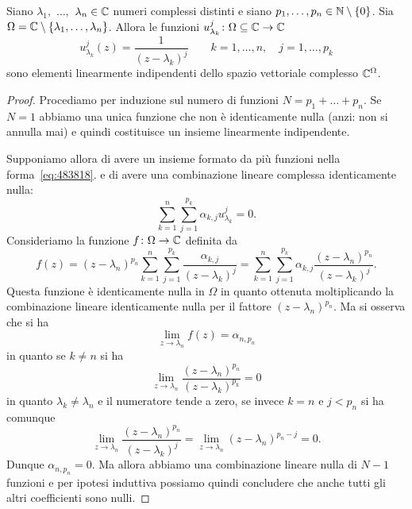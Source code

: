 \begin{lemma}
\label{lemma:72995}
Siano $\lambda_1,$ $\dots,$ $\lambda_n \in {\mathbb C}$ numeri complessi
distinti e siano $p_1,\dots,p_n \in {\mathbb N}\setminus{\left\{ 0 \right\}}$.
Sia $\Omega = {\mathbb C} \setminus {\left\{ \lambda_1, \dots, \lambda_n \right\}}$.
Allora le funzioni
$u_{\lambda_k}^{j}\colon \Omega\subseteq {\mathbb C} \to {\mathbb C}$
\begin{equation}
\label{eq:483818}
  u_{\lambda_k}^{j}(z) = \frac{1}{(z-\lambda_k)^{j}}
  \qquad k=1,\dots,n, \quad j=1,\dots, p_k
\end{equation}
sono elementi linearmente indipendenti dello spazio
vettoriale complesso ${\mathbb C}^\Omega$.
\end{lemma}
%
\begin{proof}
Procediamo per induzione sul numero di funzioni
$N=p_1+ \dots + p_n$.
Se $N=1$ abbiamo una unica funzione che non è identicamente
nulla (anzi: non si annulla mai)
e quindi costituisce un insieme linearmente indipendente.

Supponiamo allora di avere un insieme formato da più funzioni
nella forma~\eqref{eq:483818}.
e di avere
una combinazione lineare complessa identicamente nulla:
\[
\sum_{k=1}^n \sum_{j=1}^{p_k} \alpha_{k,j} u_{\lambda_k}^j = 0.
\]
Consideriamo la funzione $f\colon \Omega \to {\mathbb C}$
definita da
\begin{equation}
\label{eq:567384}
  f(z)
  = (z-\lambda_n)^{p_n}\sum_{k=1}^n \sum_{j=1}^{p_k} \frac{\alpha_{k,j}}{(z-\lambda_k)^{j}}
  = \sum_{k=1}^n \sum_{j=1}^{p_k} \alpha_{k,j}\frac{(z-\lambda_n)^{p_n}}{(z-\lambda_k)^{j}}.
\end{equation}
Questa funzione è identicamente nulla
in $\Omega$ in quanto ottenuta moltiplicando la combinazione lineare identicamente
nulla per il fattore $(z-\lambda_n)^{p_n}$.
Ma si osserva che si ha
\[
  \lim_{z\to \lambda_n} f(z) = \alpha_{n,p_n}
\]
in quanto se $k\neq n$ si ha
\[
\lim_{z\to \lambda_n}\frac{(z-\lambda_n)^{p_n}}{(z-\lambda_k)^{p_k}} = 0
\]
in quanto $\lambda_k\neq \lambda_n$ e il numeratore
tende a zero, se invece $k=n$ e $j<p_n$ si ha comunque
\[
\lim_{z\to \lambda_n}\frac{(z-\lambda_n)^{p_n}}{(z-\lambda_k)^{j}}
= \lim_{z\to \lambda_n}(z-\lambda_n)^{p_n-j} = 0.
\]
Dunque $\alpha_{n,p_n}=0$.
Ma allora abbiamo una combinazione lineare nulla di $N-1$
funzioni e per ipotesi induttiva possiamo quindi concludere
che anche tutti gli altri coefficienti sono nulli.
\end{proof}


